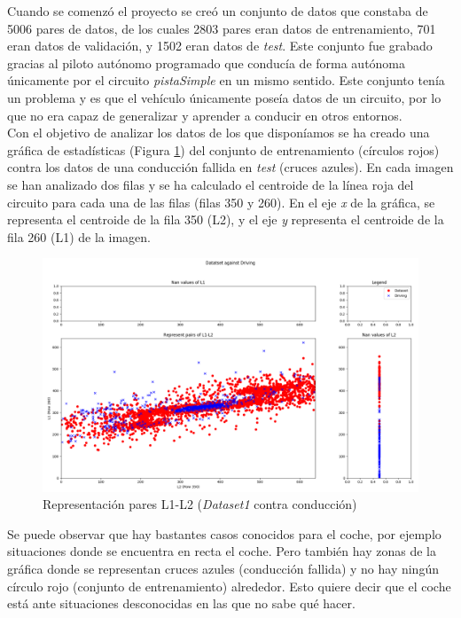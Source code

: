 Cuando se comenzó el proyecto se creó un conjunto de datos que constaba de 5006 pares de datos, de los cuales 2803 pares eran datos de entrenamiento, 701 eran datos de validación, y 1502 eran datos de \textit{test}. Este conjunto fue grabado gracias al piloto autónomo programado que conducía de forma autónoma únicamente por el circuito \textit{pistaSimple} en un mismo sentido. Este conjunto tenía un problema y es que el vehículo únicamente poseía datos de un circuito, por lo que no era capaz de generalizar y aprender a conducir en otros entornos.\\

Con el objetivo de analizar los datos de los que disponíamos se ha creado una gráfica de estadísticas (Figura \ref{fig.L1_L2_dataset1}) del conjunto de entrenamiento (círculos rojos) contra los datos de una conducción fallida en \textit{test} (cruces azules). En cada imagen se han analizado dos filas y se ha calculado el centroide de la línea roja del circuito para cada una de las filas (filas 350 y 260). En el eje \textit{x} de la gráfica, se representa el centroide de la fila 350 (L2), y el eje \textit{y} representa el centroide de la fila 260 (L1) de la imagen.\\


\begin{figure}
  \begin{center}
    \includegraphics[width=1\textwidth]{figures/Infraestructura/L1_L2_dataset1_driving.png}
		\caption{Representación pares L1-L2 (\textit{Dataset1} contra conducción)}
		\label{fig.L1_L2_dataset1}
		\end{center}
\end{figure}

Se puede observar que hay bastantes casos conocidos para el coche, por ejemplo situaciones donde se encuentra en recta el coche. Pero también hay zonas de la gráfica donde se representan cruces azules (conducción fallida) y no hay ningún círculo rojo (conjunto de entrenamiento) alrededor. Esto quiere decir que el coche está ante situaciones desconocidas en las que no sabe qué hacer. \\

